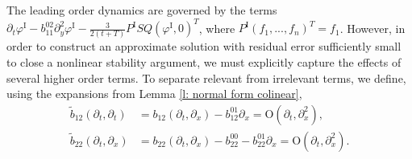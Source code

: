 \documentclass[11pt]{article}
\renewcommand{\phi}{\varphi}
\numberwithin{equation}{section}
\numberwithin{prop}{section}
\newcommand{\phiI}{\phi^\mathrm{I}}
\begin{document}
The leading order dynamics are governed by the terms $\partial_t \phiI - b_{11}^{02} \partial_y^2 \phiI - \frac{3}{2 (t+T)} P^\mathrm{I} SQ (\phiI, 0)^T$, where $P^\mathrm{I} (f_1, ..., f_n)^T = f_1$. However, in order to construct an approximate solution with residual error sufficiently small to close a nonlinear stability argument, we must explicitly capture the effects of several higher order terms. To separate relevant from irrelevant terms, we define, using the expansions from Lemma \ref{l: normal form colinear},
\begin{align}
\tilde{b}_{12} (\partial_t, \partial_t) &= b_{12}(\partial_t, \partial_x) - b_{12}^{01} \partial_x = \mathrm{O}(\partial_t, \partial_x^2), \\
\tilde{b}_{22} (\partial_t, \partial_x) &= b_{22}(\partial_t, \partial_x) - b_{22}^{00} - b_{22}^{01} \partial_x = \mathrm{O}(\partial_t, \partial_x^2). 
\end{align}
\end{document}
